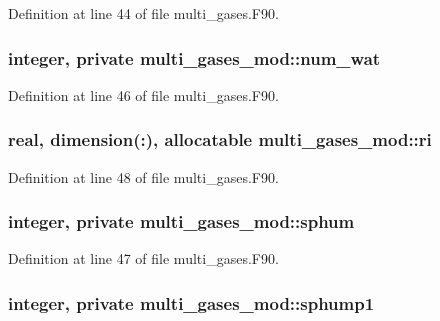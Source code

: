 Definition at line 44 of file multi\-\_\-gases.\-F90.

\subsubsection[{num\-\_\-wat}]{\setlength{\rightskip}{0pt plus 5cm}integer, private multi\-\_\-gases\-\_\-mod\-::num\-\_\-wat\hspace{0.3cm}{\ttfamily [private]}}\label{classmulti__gases__mod_a927f93aad16256efbf50824dc3897194}


Definition at line 46 of file multi\-\_\-gases.\-F90.

\subsubsection[{ri}]{\setlength{\rightskip}{0pt plus 5cm}real, dimension(\-:), allocatable multi\-\_\-gases\-\_\-mod\-::ri}\label{classmulti__gases__mod_acdbd2cbc0014ad073f6daadeffc5cfce}


Definition at line 48 of file multi\-\_\-gases.\-F90.

\subsubsection[{sphum}]{\setlength{\rightskip}{0pt plus 5cm}integer, private multi\-\_\-gases\-\_\-mod\-::sphum\hspace{0.3cm}{\ttfamily [private]}}\label{classmulti__gases__mod_ac1567ae48756e1ad1df7f99d1a86592a}


Definition at line 47 of file multi\-\_\-gases.\-F90.

\subsubsection[{sphump1}]{\setlength{\rightskip}{0pt plus 5cm}integer, private multi\-\_\-gases\-\_\-mod\-::sphump1\hspace{0.3cm}{\ttfamily [private]}}\label{classmulti__gases__mod_a0e5f32ab60bce2b41eda0ae1e1f47bee}


